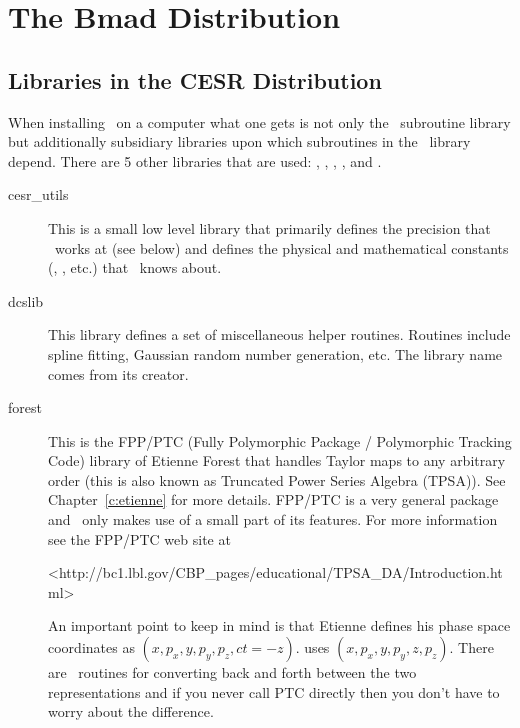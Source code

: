\chapter{The Bmad Distribution}
\label{c:distribution}

\section{Libraries in the CESR Distribution}
\label{s:libs}

When installing \bmad\ on a computer what one gets is not only the
\bmad\ subroutine library but additionally subsidiary libraries upon
which subroutines in the \bmad\ library depend. There are 5 other
libraries that are used: , ,
, , and .
\begin{description}
\item[cesr\_utils] This is a small low level library that primarily defines 
the precision that \bmad\ works at (see below) and defines the physical
and mathematical constants (, , etc.) that \bmad\ knows
about.
\item[dcslib] This library defines a set of miscellaneous helper routines. 
Routines include spline fitting, Gaussian random number generation,
etc. The library name comes from its creator.
\item[forest] This is the FPP/PTC 
(Fully Polymorphic Package / Polymorphic Tracking Code) library of
Etienne Forest that handles Taylor maps to any arbitrary order (this
is also known as Truncated Power Series Algebra (TPSA)). See
Chapter~\ref{c:etienne} for more details.  FPP/PTC is a very general
package and \bmad\ only makes use of a small part of its features.
For more information see the FPP/PTC web site at
\begin{example} 
    <http://bc1.lbl.gov/CBP_pages/educational/TPSA_DA/Introduction.html>
\end{example}

An important point to keep in mind is that Etienne defines his phase
space coordinates as $(x, p_x, y, p_y, p_z, ct = -z)$. \bmad uses
$(x, p_x, y, p_y, z, p_z)$. There are
\bmad\ routines for converting back and forth between the two 
representations and if you never call PTC directly then you don't
have to worry about the difference.


\end{description}
